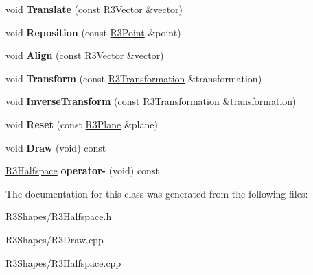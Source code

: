 \begin{DoxyCompactItemize}
\item 
void {\bfseries Translate} (const \hyperlink{class_r3_vector}{R3\+Vector} \&vector)\hypertarget{class_r3_halfspace_ad8a56713fd2e06b50988996bbc000f41}{}\label{class_r3_halfspace_ad8a56713fd2e06b50988996bbc000f41}

\item 
void {\bfseries Reposition} (const \hyperlink{class_r3_point}{R3\+Point} \&point)\hypertarget{class_r3_halfspace_ab838a774e946cc278d8410815d0e2355}{}\label{class_r3_halfspace_ab838a774e946cc278d8410815d0e2355}

\item 
void {\bfseries Align} (const \hyperlink{class_r3_vector}{R3\+Vector} \&vector)\hypertarget{class_r3_halfspace_a562ab8112596cabbd146fa801c99a38e}{}\label{class_r3_halfspace_a562ab8112596cabbd146fa801c99a38e}

\item 
void {\bfseries Transform} (const \hyperlink{class_r3_transformation}{R3\+Transformation} \&transformation)\hypertarget{class_r3_halfspace_af19354d13feb4a301d3d4f437cb1e752}{}\label{class_r3_halfspace_af19354d13feb4a301d3d4f437cb1e752}

\item 
void {\bfseries Inverse\+Transform} (const \hyperlink{class_r3_transformation}{R3\+Transformation} \&transformation)\hypertarget{class_r3_halfspace_a4a1ccfebe000d2b62faf2e4d9740524c}{}\label{class_r3_halfspace_a4a1ccfebe000d2b62faf2e4d9740524c}

\item 
void {\bfseries Reset} (const \hyperlink{class_r3_plane}{R3\+Plane} \&plane)\hypertarget{class_r3_halfspace_a1bd7bc02b73d7733a1fde22ea27ad530}{}\label{class_r3_halfspace_a1bd7bc02b73d7733a1fde22ea27ad530}

\item 
void {\bfseries Draw} (void) const \hypertarget{class_r3_halfspace_a9241be5218ced2802dcf6da3a3b9c875}{}\label{class_r3_halfspace_a9241be5218ced2802dcf6da3a3b9c875}

\item 
\hyperlink{class_r3_halfspace}{R3\+Halfspace} {\bfseries operator-\/} (void) const \hypertarget{class_r3_halfspace_a62a80d8baa87c42667304ff878ca70de}{}\label{class_r3_halfspace_a62a80d8baa87c42667304ff878ca70de}

\end{DoxyCompactItemize}


The documentation for this class was generated from the following files\+:\begin{DoxyCompactItemize}
\item 
R3\+Shapes/R3\+Halfspace.\+h\item 
R3\+Shapes/R3\+Draw.\+cpp\item 
R3\+Shapes/R3\+Halfspace.\+cpp\end{DoxyCompactItemize}
